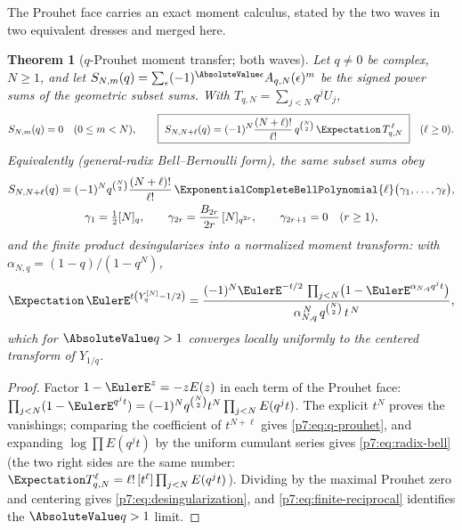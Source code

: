 \documentclass[11pt,oneside]{article}
\numberwithin{equation}{section}
\newtheorem{theorem}{Theorem}[section]
\theoremstyle{definition}
\theoremstyle{remark}
\begin{document}
The Prouhet face carries an exact moment calculus, stated by the two waves in
two equivalent dresses and merged here.

\begin{theorem}[$q$-Prouhet moment transfer; both waves]
\label{p7:thm:q-prouhet}
Let $q\ne0$ be complex, $N\ge1$, and let
$S_{N,m}(q)=\sum_{\epsilon}(-1)^{\AbsoluteValue\epsilon}A_{q,N}(\epsilon)^m$ be the
signed power sums of the geometric subset sums.  With
$T_{q,N}=\sum_{j<N}q^jU_j$,
\begin{equation}\label{p7:eq:q-prouhet}
 S_{N,m}(q)=0\quad(0\le m<N),
 \qquad
 \boxed{\ S_{N,N+\ell}(q)
 =(-1)^N\frac{(N+\ell)!}{\ell!}\,q^{\binom N2}\,
 \Expectation\,T_{q,N}^{\,\ell}\ }
 \quad(\ell\ge0).
\end{equation}
Equivalently (general-radix Bell--Bernoulli form), the same subset sums obey
\begin{gather}
 S_{N,N+\ell}(q)
 =(-1)^Nq^{\binom N2}\frac{(N+\ell)!}{\ell!}\,
 \ExponentialCompleteBellPolynomial{\ell}\bigl(\gamma_1,\ldots,\gamma_\ell\bigr),
 \label{p7:eq:radix-bell}\\
 \gamma_1=\tfrac12[N]_q,\qquad
 \gamma_{2r}=\frac{B_{2r}}{2r}\,[N]_{q^{2r}},\qquad
 \gamma_{2r+1}=0\quad(r\ge1),\notag
\end{gather}
and the finite product desingularizes into a normalized moment transform:
with $\alpha_{N,q}=(1-q)/(1-q^N)$,
\begin{equation}\label{p7:eq:desingularization}
 \Expectation\,\EulerE^{t\left(Y_q^{[N]}-1/2\right)}
 =\frac{(-1)^N\EulerE^{-t/2}\,
 \prod_{j<N}\bigl(1-\EulerE^{\alpha_{N,q}q^jt}\bigr)}
 {\alpha_{N,q}^{\,N}\,q^{\binom N2}\,t^{\,N}},
\end{equation}
which for $\AbsoluteValue q>1$ converges locally uniformly to the centered transform of
$Y_{1/q}$.
\end{theorem}

\begin{proof}
Factor $1-\EulerE^{z}=-zE(z)$ in each term of the Prouhet face:
$\prod_{j<N}(1-\EulerE^{q^jt})=(-1)^Nq^{\binom N2}t^N\prod_{j<N}E(q^jt)$.  The
explicit $t^N$ proves the vanishings; comparing the coefficient of
$t^{N+\ell}$ gives \eqref{p7:eq:q-prouhet}, and expanding
$\log\prod E(q^jt)$ by the uniform cumulant series gives
\eqref{p7:eq:radix-bell} (the two right sides are the same number:
$\Expectation T_{q,N}^{\ell}=\ell!\,[t^\ell]\prod_{j<N}E(q^jt)$).  Dividing by the
maximal Prouhet zero and centering gives \eqref{p7:eq:desingularization},
and \eqref{p7:eq:finite-reciprocal} identifies the $\AbsoluteValue q>1$ limit.
\end{proof}
\end{document}
